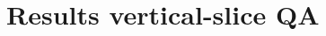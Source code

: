 \documentclass[aps,prl,twocolumn]{revtex4-2}
\begin{document}
\section{Results vertical-slice QA}

\end{document}
